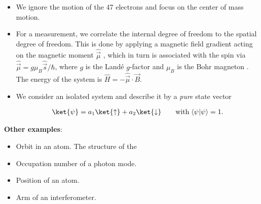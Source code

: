 \begin{itemize}
						\item 	We ignore the motion of the 47 electrons and focus on the center of mass motion.
						\item 	For a measurement, we correlate the internal degree of freedom to the spatial degree of freedom. This is done by applying a magnetic field gradient acting on the magnetic moment $\hat{\vec{\mu}}$ , which in turn is associated with the spin via $\hat{\vec{\mu}} = g \mu_B \hat{\vec{s}}/\hbar$, where $g$ is the Landé $g$-factor  and $\mu_B$ is the Bohr magneton . The energy of the system is $\hat{H} = -\hat{\vec{\mu}} \cdot \vec{B}$.
						\item 	We consider an isolated system and describe it by a \emph{pure} state vector

\begin{align}
	\ket{\psi} = a_1 \ket{\uparrow} + a_2 \ket{\downarrow}  \qquad \text{with} \; \langle\psi | \psi\rangle = 1.
\end{align}
\end{itemize}
\textbf{Other examples}:
\begin{itemize}
\item Orbit in an atom. The structure of the 
\item Occupation number of a photon mode.
\item Position of an atom.
\item Arm of an interferometer.
\end{itemize}
